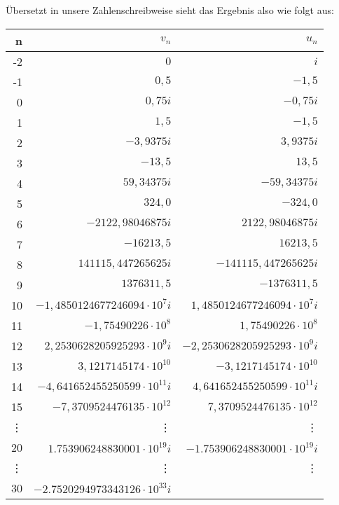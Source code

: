 Übersetzt in unsere Zahlenschreibweise sieht das Ergebnis also wie folgt aus:

\begin{table}[htbp]
\begin{center} \scriptsize
\begin{tabular}{|r||r|r|}
\hline
n        & $v_n$                             & $u_n$
\\\hline\hline
-2       & $0$                               & $i$
\\-1     & $0,5$                             & $-1,5 $
\\0      & $0,75i$                          & $-0,75i$
\\1      & $1,5$                            & $-1,5$
\\2      & $-3,9375i$                         & $3,9375i$
\\3      & $-13,5$                            & $13,5$
\\4      & $59,34375i$                      & $-59,34375i$
\\5      & $324,0$                          & $-324,0$
\\6      & $-2122,98046875i$                  & $2122,98046875i$
\\7      & $-16213,5$                         & $16213,5$
\\8      & $141115,447265625i$              & $-141115,447265625i$
\\9      & $1376311,5$                      & $-1376311,5$
\\10     & $-1,4850124677246094\cdot10^7i$    & $1,4850124677246094\cdot10^7i$
\\11     & $-1,75490226\cdot10^8$             & $1,75490226\cdot10^8$
\\12     & $2,2530628205925293\cdot10^9i$   & $-2,2530628205925293\cdot10^9i$
\\13     & $3,1217145174\cdot10^{10}$       & $-3,1217145174\cdot10^{10}$
\\14     & $-4,641652455250599\cdot10^{11}i$ &
$4,641652455250599\cdot10^{11}i$
\\15     & $-7,3709524476135\cdot10^{12}$     & $7,3709524476135\cdot10^{12}$
\\\vdots & \vdots                            & \vdots
\\20     & $1.753906248830001\cdot10^{19}i$ & $-1.753906248830001\cdot10^{19}i$
\\\vdots & \vdots                            & \vdots
\\30     & $-2.7520294973343126\cdot10^{33}i$ &

\end{tabular}
\end{center}
\end{table}
